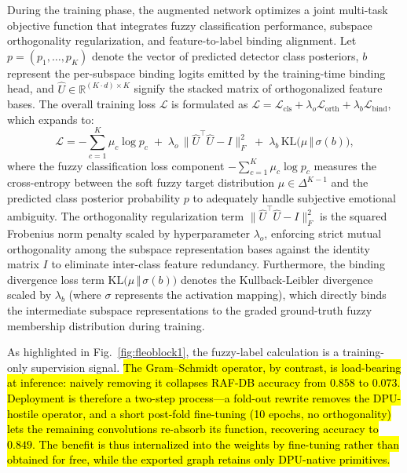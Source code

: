 \documentclass[algorithms,article,submit,moreauthors]{Definitions/mdpi}
\newcommand{\rev}[1]{\hl{#1}}
\begin{document}
During the training phase, the augmented network optimizes a joint multi-task objective function that integrates fuzzy classification performance, subspace orthogonality regularization, and feature-to-label binding alignment. Let $p = (p_1, \dots, p_K)$ denote the vector of predicted detector class posteriors, $b$ represent the per-subspace binding logits emitted by the training-time binding head, and $\hat{U} \in \mathbb{R}^{(K \cdot d) \times K}$ signify the stacked matrix of orthogonalized feature bases. The overall training loss $\mathcal{L}$ is formulated as $\mathcal{L} = \mathcal{L}_{\text{cls}} + \lambda_{o} \mathcal{L}_{\text{orth}} + \lambda_{b} \mathcal{L}_{\text{bind}}$, which expands to:
\begin{equation}
\mathcal{L} = -\sum_{c=1}^{K}\mu_c\log p_c
\;+\;\lambda_{o}\,\bigl\lVert\hat{U}^{\!\top}\hat{U}-I\bigr\rVert_F^{2}
\;+\;\lambda_{b}\,\mathrm{KL}\!\bigl(\mu\,\Vert\,\sigma(b)\bigr),
\label{eq:fuzzyloss}
\end{equation}
where the fuzzy classification loss component $-\sum_{c=1}^{K}\mu_c\log p_c$ measures the cross-entropy between the soft fuzzy target distribution $\mu \in \Delta^{K-1}$ and the predicted class posterior probability $p$ to adequately handle subjective emotional ambiguity. The orthogonality regularization term $\bigl\lVert\hat{U}^{\!\top}\hat{U}-I\bigr\rVert_F^2$ is the squared Frobenius norm penalty scaled by hyperparameter $\lambda_{o}$, enforcing strict mutual orthogonality among the subspace representation bases against the identity matrix $I$ to eliminate inter-class feature redundancy. Furthermore, the binding divergence loss term $\mathrm{KL}\bigl(\mu\,\Vert\,\sigma(b)\bigr)$ denotes the Kullback-Leibler divergence scaled by $\lambda_{b}$ (where $\sigma$ represents the activation mapping), which directly binds the intermediate subspace representations to the graded ground-truth fuzzy membership distribution during training.

As highlighted in Fig.~\ref{fig:fleoblock1}, the fuzzy-label calculation is a training-only supervision signal. \rev{The Gram--Schmidt operator, by contrast, is load-bearing at inference: naively removing it collapses RAF-DB accuracy from \mbox{$0.858$} to \mbox{$0.073$}. Deployment is therefore a two-step process---a fold-out rewrite removes the DPU-hostile operator, and a short post-fold fine-tuning (10 epochs, no orthogonality) lets the remaining convolutions re-absorb its function, recovering accuracy to \mbox{$0.849$}. The benefit is thus internalized into the weights by fine-tuning rather than obtained for free, while the exported graph retains only DPU-native primitives.}
\end{document}
